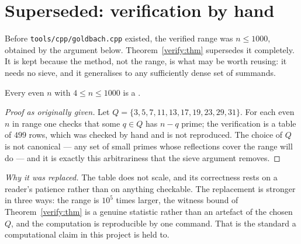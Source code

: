 \section{Superseded: verification by hand}\label{sec:hand}

Before \texttt{tools/cpp/goldbach.cpp} existed, the verified range was
$n\leq1000$, obtained by the argument below.  Theorem~\ref{verify:thm}
supersedes it completely.  It is kept because the method, not the range, is
what may be worth reusing: it needs no sieve, and it generalises to any
sufficiently dense set of summands.

\begin{prop}\label{hand:prop}
Every even $n$ with $4\leq n\leq1000$ is a .
\end{prop}

\begin{proof}[Proof as originally given]
Let $Q=\{3,5,7,11,13,17,19,23,29,31\}$.  For each even $n$ in range one checks
that some $q\in Q$ has $n-q$ prime; the verification is a table of $499$ rows,
which was checked by hand and is not reproduced.  The choice of $Q$ is not
canonical --- any set of small primes whose reflections cover the range will
do --- and it is exactly this arbitrariness that the sieve argument removes.
\end{proof}

\emph{Why it was replaced.}  The table does not scale, and its correctness
rests on a reader's patience rather than on anything checkable.  The
replacement is stronger in three ways: the range is $10^{5}$ times larger, the
witness bound of Theorem~\ref{verify:thm} is a genuine statistic rather than an
artefact of the chosen $Q$, and the computation is reproducible by one command.
That is the standard a computational claim in this project is held to.
